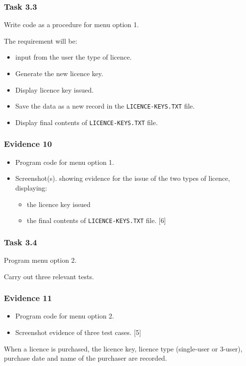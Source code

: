 \subsubsection*{Task 3.3}

Write code as a procedure for menu option 1.

The requirement will be: 
\begin{itemize}
\item input from the user the type of licence.
\item Generate the new licence key. 
\item Display licence key issued.
\item Save the data as a new record in the \texttt{LICENCE-KEYS.TXT} file. 
\item Display final contents of \texttt{LICENCE-KEYS.TXT} file. 
\end{itemize}

\subsubsection*{Evidence 10}
\begin{itemize}
\item Program code for menu option 1. 
\item Screenshot(s). showing evidence for the issue of the two types of
licence, displaying: 
\begin{itemize}
\item the licence key issued 
\item the final contents of \texttt{LICENCE-KEYS.TXT} file. \hfill{}{[}6{]}
\end{itemize}
\end{itemize}

\subsubsection*{Task 3.4}

Program menu option 2.

Carry out three relevant tests.

\subsubsection*{Evidence 11}
\begin{itemize}
\item Program code for menu option 2.
\item Screenshot evidence of three test cases. \hfill{}{[}5{]}
\end{itemize}
When a licence is purchased, the licence key, licence type (single-user
or 3-user), purchase date and name of the purchaser are recorded. 

